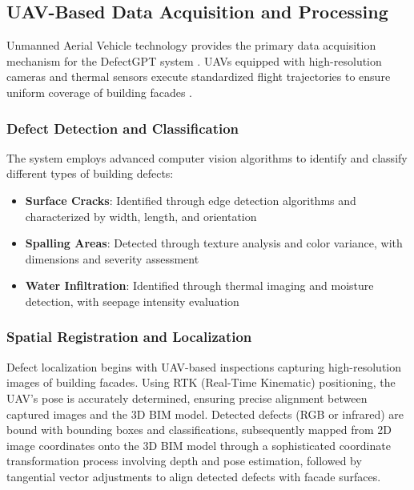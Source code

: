 \subsection{UAV-Based Data Acquisition and Processing}

Unmanned Aerial Vehicle technology provides the primary data acquisition mechanism for the DefectGPT system \cite{ribeiro2020remote,tan2021automatic}. UAVs equipped with high-resolution cameras and thermal sensors execute standardized flight trajectories to ensure uniform coverage of building facades \cite{liu2021integrating}.

\subsubsection{Defect Detection and Classification}

The system employs advanced computer vision algorithms to identify and classify different types of building defects:

\begin{itemize}
    \item \textbf{Surface Cracks}: Identified through edge detection algorithms and characterized by width, length, and orientation
    \item \textbf{Spalling Areas}: Detected through texture analysis and color variance, with dimensions and severity assessment
    \item \textbf{Water Infiltration}: Identified through thermal imaging and moisture detection, with seepage intensity evaluation
\end{itemize}

\subsubsection{Spatial Registration and Localization}

Defect localization begins with UAV-based inspections capturing high-resolution images of building facades. Using RTK (Real-Time Kinematic) positioning, the UAV's pose is accurately determined, ensuring precise alignment between captured images and the 3D BIM model. Detected defects (RGB or infrared) are bound with bounding boxes and classifications, subsequently mapped from 2D image coordinates onto the 3D BIM model through a sophisticated coordinate transformation process involving depth and pose estimation, followed by tangential vector adjustments to align detected defects with facade surfaces.


